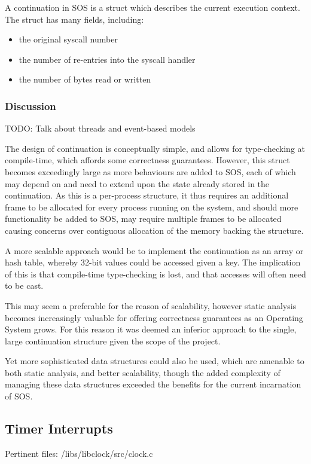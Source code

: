 \documentclass[a4paper,12pt]{article}
\begin{document}
A continuation in SOS is a struct which describes the current execution
context.  The struct has many fields, including:

\begin{itemize}
\item the original syscall number
\item the number of re-entries into the syscall handler
\item the number of bytes read or written
\end{itemize}

\subsubsection{Discussion}
TODO: Talk about threads and event-based models

The design of continuation is conceptually simple, and allows for
type-checking at compile-time, which affords some correctness guarantees.
However, this struct becomes exceedingly large as more behaviours are added to
SOS, each of which may depend on and need to extend upon the state already
stored in the continuation.  As this is a per-process structure, it thus
requires an additional frame to be allocated for every process running on the
system, and should more functionality be added to SOS, may require multiple
frames to be allocated causing concerns over contiguous allocation of the
memory backing the structure.

A more scalable approach would be to implement the continuation as an array or
hash table, whereby 32-bit values could be accessed given a key.  The
implication of this is that compile-time type-checking is lost, and that
accesses will often need to be cast.

This may seem a preferable for the reason of scalability, however static
analysis becomes increasingly valuable for offering correctness guarantees as
an Operating System grows.  For this reason it was deemed an inferior approach
to the single, large continuation structure given the scope of the project.

Yet more sophisticated data structures could also be used, which are amenable
to both static analysis, and better scalability, though the added complexity
of managing these data structures exceeded the benefits for the current
incarnation of SOS.

\subsection{Timer Interrupts}
Pertinent files: /libs/libclock/src/clock.c
\end{document}
